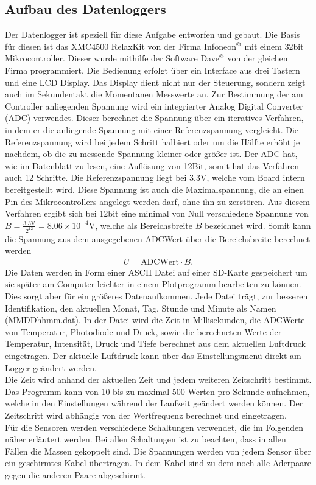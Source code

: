 \documentclass[12pt,a4paper,titlepage,headinclude,bibtotoc]{scrartcl}
\numberwithin{equation}{subsection}
\begin{document}
\subsection{Aufbau des Datenloggers}
Der Datenlogger ist speziell für diese Aufgabe entworfen und gebaut.
Die Basis für diesen ist das XMC4500 RelaxKit von der Firma Infoneon$^\copyright$ mit einem 32bit Mikrocontroller.
Dieser wurde mithilfe der Software Dave$^\copyright$ von der gleichen Firma programmiert.
Die Bedienung erfolgt über ein Interface aus drei Tastern und eine LCD Display.
Das Display dient nicht nur der Steuerung, sondern zeigt auch im Sekundentakt die Momentanen Messwerte an.
Zur Bestimmung der am Controller anliegenden Spannung wird ein integrierter Analog Digital Converter (ADC) verwendet.
Dieser berechnet die Spannung über ein iteratives Verfahren, in dem er die anliegende Spannung mit einer Referenzspannung vergleicht.
Die Referenzspannung wird bei jedem Schritt halbiert oder um die Hälfte erhöht je nachdem, ob die zu messende Spannung kleiner oder größer ist.
Der ADC hat, wie im Datenblatt \cite[7]{XMCRelaxkit} zu lesen, eine Auflösung von 12Bit, somit hat das Verfahren auch 12 Schritte.
Die Referenzspannung liegt bei 3.3\si{\volt}, welche vom Board intern bereitgestellt wird.
Diese Spannung ist auch die Maximalspannung, die an einen Pin des Mikrocontrollers angelegt werden darf, ohne ihn zu zerstören.
Aus diesem Verfahren ergibt sich bei 12bit eine minimal von Null verschiedene Spannung von $B=\frac{3.3\si{\volt}}{2^{12}}=8.06\times10^{-4}\si{\volt}$, welche als Bereichsbreite $B$ bezeichnet wird.
Somit kann die Spannung aus dem ausgegebenen ADCWert über die Bereichsbreite berechnet werden
\begin{align}
	U=\text{ADCWert}\cdot B.\label{eq:ADCwert}
\end{align}
Die Daten werden in Form einer ASCII Datei auf einer SD-Karte gespeichert um sie später am Computer leichter in einem Plotprogramm bearbeiten zu können.
Dies sorgt aber für ein größeres Datenaufkommen.
Jede Datei trägt, zur besseren Identifikation, den aktuellen Monat, Tag, Stunde und Minute als Namen (MMDDhhmm.dat).
In der Datei wird die Zeit in Millisekunden, die ADCWerte von Temperatur, Photodiode und Druck, sowie die berechneten Werte der Temperatur, Intensität, Druck und Tiefe berechnet aus dem aktuellen Luftdruck eingetragen.
Der aktuelle Luftdruck kann über das Einstellungsmenü direkt am Logger geändert werden.\\
Die Zeit wird anhand der aktuellen Zeit und jedem weiteren Zeitschritt bestimmt.
Das Programm kann von 10 bis zu maximal 500 Werten pro Sekunde aufnehmen, welche in den Einstellungen während der Laufzeit geändert werden können.
Der Zeitschritt wird abhängig von der Wertfrequenz berechnet und eingetragen.\\
Für die Sensoren werden verschiedene Schaltungen verwendet, die im Folgenden näher erläutert werden.
Bei allen Schaltungen ist zu beachten, dass in allen Fällen die Massen gekoppelt sind.
Die Spannungen werden von jedem Sensor über ein geschirmtes Kabel übertragen.
In dem Kabel sind zu dem noch alle Aderpaare gegen die anderen Paare abgeschirmt.
\end{document}
